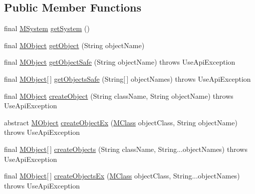 \subsection*{Public Member Functions}
\begin{DoxyCompactItemize}
\item 
final \hyperlink{classorg_1_1tzi_1_1use_1_1uml_1_1sys_1_1_m_system}{M\-System} \hyperlink{classorg_1_1tzi_1_1use_1_1api_1_1_use_system_api_a5a2a61f73be8b23558666ef278b58996}{get\-System} ()
\item 
final \hyperlink{interfaceorg_1_1tzi_1_1use_1_1uml_1_1sys_1_1_m_object}{M\-Object} \hyperlink{classorg_1_1tzi_1_1use_1_1api_1_1_use_system_api_a2a67b7354c5b0858425310a34c9faab8}{get\-Object} (String object\-Name)
\item 
final \hyperlink{interfaceorg_1_1tzi_1_1use_1_1uml_1_1sys_1_1_m_object}{M\-Object} \hyperlink{classorg_1_1tzi_1_1use_1_1api_1_1_use_system_api_aedbdc55c1a77baf764802120ec3e3af2}{get\-Object\-Safe} (String object\-Name)  throws Use\-Api\-Exception 
\item 
final \hyperlink{interfaceorg_1_1tzi_1_1use_1_1uml_1_1sys_1_1_m_object}{M\-Object}\mbox{[}$\,$\mbox{]} \hyperlink{classorg_1_1tzi_1_1use_1_1api_1_1_use_system_api_aa9fe978782e22ab0c1cffbe7d1cf6dd8}{get\-Objects\-Safe} (String\mbox{[}$\,$\mbox{]} object\-Names)  throws Use\-Api\-Exception 
\item 
final \hyperlink{interfaceorg_1_1tzi_1_1use_1_1uml_1_1sys_1_1_m_object}{M\-Object} \hyperlink{classorg_1_1tzi_1_1use_1_1api_1_1_use_system_api_a508a139f2f77475455d2dba719fc3974}{create\-Object} (String class\-Name, String object\-Name)  throws Use\-Api\-Exception 
\item 
abstract \hyperlink{interfaceorg_1_1tzi_1_1use_1_1uml_1_1sys_1_1_m_object}{M\-Object} \hyperlink{classorg_1_1tzi_1_1use_1_1api_1_1_use_system_api_adba0cddd0a84c728b8ddd3c73f1828f6}{create\-Object\-Ex} (\hyperlink{interfaceorg_1_1tzi_1_1use_1_1uml_1_1mm_1_1_m_class}{M\-Class} object\-Class, String object\-Name)  throws Use\-Api\-Exception
\item 
final \hyperlink{interfaceorg_1_1tzi_1_1use_1_1uml_1_1sys_1_1_m_object}{M\-Object}\mbox{[}$\,$\mbox{]} \hyperlink{classorg_1_1tzi_1_1use_1_1api_1_1_use_system_api_ad8e4fd49c41f1b8ae3f97279fbdb9054}{create\-Objects} (String class\-Name, String...\-object\-Names)  throws Use\-Api\-Exception 
\item 
final \hyperlink{interfaceorg_1_1tzi_1_1use_1_1uml_1_1sys_1_1_m_object}{M\-Object}\mbox{[}$\,$\mbox{]} \hyperlink{classorg_1_1tzi_1_1use_1_1api_1_1_use_system_api_ab558ac5c6b1c80c24a34493d883f7099}{create\-Objects\-Ex} (\hyperlink{interfaceorg_1_1tzi_1_1use_1_1uml_1_1mm_1_1_m_class}{M\-Class} object\-Class, String...\-object\-Names)  throws Use\-Api\-Exception 

\end{DoxyCompactItemize}
